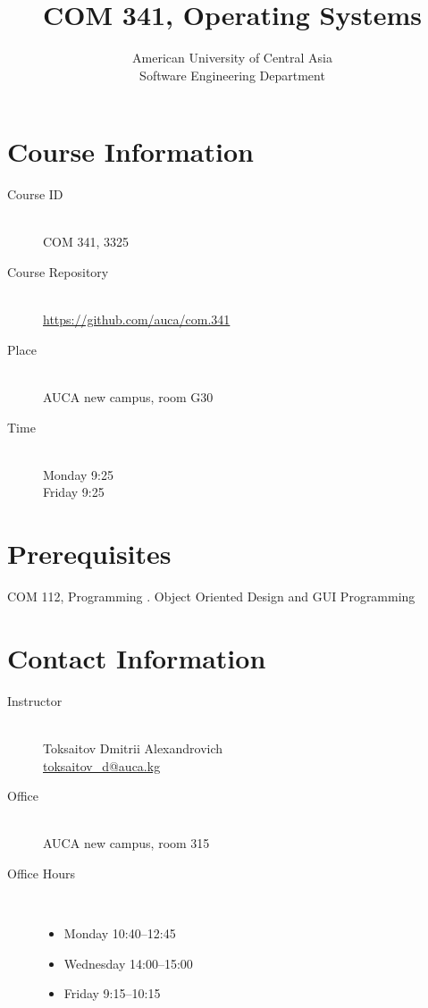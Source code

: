 \documentclass[12pt,a4paper,oneside]{article}
\begin{document}
    \title{COM 341, Operating Systems}
    \author{
        American University of Central Asia\\
        Software Engineering Department
    }
    \date{}
    \maketitle

    \section{Course Information}

        \begin{description}
            \item[Course ID]\hfill\\
                COM 341, 3325
            \item[Course Repository]\hfill\\
                \url{https://github.com/auca/com.341}
            \item[Place]\hfill\\
                AUCA new campus, room G30
            \item[Time]\hfill\\
                Monday 9:25\\
                Friday 9:25
        \end{description}

    \section{Prerequisites}

        COM 112, Programming \uppercase\expandafter{\relax}. Object Oriented Design and GUI Programming

        \section{Contact Information}

            \begin{description}
                \item[Instructor]\hfill\\
                    Toksaitov Dmitrii Alexandrovich\\
                    \href{mailto:toksaitov_d@auca.kg}{toksaitov\_d@auca.kg}
                \item[Office]\hfill\\
                    AUCA new campus, room 315
                \item[Office Hours]\hfill\\
                    \begin{itemize}
                        \item Monday 10:40--12:45
                        \item Wednesday 14:00--15:00
                        \item Friday 9:15--10:15
                    \end{itemize}
            \end{description}
\end{document}
